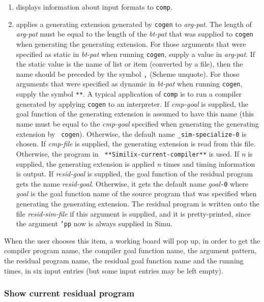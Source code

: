 \begin{sloppypar}
\begin{enumerate}

\item displays information about input formats to {\tt comp}.

\item applies a generating extension generated by {\tt cogen} to {\it
   arg-pat}. The length of {\it arg-pat} must be equal to the length
   of the {\it bt-pat} that was supplied to {\tt cogen} when
   generating the generating extension. For those arguments that were
   specified as static in {\it bt-pat} when running {\tt cogen},
   supply a value in {\it arg-pat}. If the static value is the name of
   list or item (converted by a file), then the name should be
   preceded by the symbol {\tt ,} (Scheme unquote). For those
   arguments that were specified as dynamic in {\it bt-pat} when
   running {\tt cogen}, supply the symbol {\tt ***}.  A typical
   application of {\tt comp} is to run a compiler generated by
   applying {\tt cogen} to an interpreter. If {\it cmp-goal} is
   supplied, the goal function of the generating extension is assumed
   to have this name (this name must be equal to the {\it cmp-goal}
   specified when generating the generating extension by {\tt
   cogen}). Otherwise, the default name {\tt \_sim-specialize-0} is
   chosen. If {\it cmp-file} is supplied, the generating extension is
   read from this file.  Otherwise, the program in {\tt
   **Similix-current-compiler**} is used.  If {\it n} is supplied, the
   generating extension is applied {\it n} times and timing
   information is output.  If {\it resid-goal} is supplied, the goal
   function of the residual program gets the name {\it resid-goal}.
   Otherwise, it gets the default name {\it goal}{\tt -0} where {\it
   goal} is the goal function name of the source program that was
   specified when generating the generating extension. The residual
   program is written onto the file {\it resid-sim-file} if this
   argument is supplied, and it is pretty-printed, since the argument
   {\tt 'pp} now is always supplied in Simu.
\end{enumerate}
\par
   When the user chooses this item, a working board will pop up, in
order to get the compiler program name, the compiler goal function
name, the argument pattern, the residual program name, the residual
goal function name and the running times, in six input entries (but
some input entries may be left empty).

\subsubsection{Show current residual program}


\end{sloppypar}
